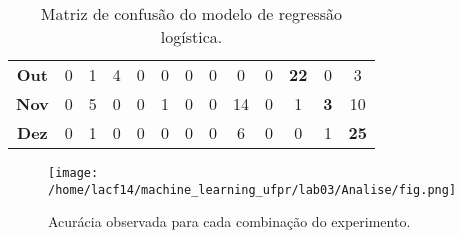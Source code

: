 \begin{table}[h]
\begin{tabular}{c|cccccccccccc}
\textbf{Out} & 0                                & 1                                & 4                                & 0                                & 0                               & 0                               & 0                                & 0                                & \multicolumn{1}{c|}{0}           & \multicolumn{1}{c|}{\textbf{22}} & 0                               & 3                                \\ \cline{11-12}
\textbf{Nov} & 0                                & 5                                & 0                                & 0                                & 1                               & 0                               & 0                                & 14                               & 0                                & \multicolumn{1}{c|}{1}           & \multicolumn{1}{c|}{\textbf{3}} & 10                               \\ \cline{12-13} 
\textbf{Dez} & 0                                & 1                                & 0                                & 0                                & 0                               & 0                               & 0                                & 6                                & 0                                & 0                                & \multicolumn{1}{c|}{1}          & \multicolumn{1}{c|}{\textbf{25}} \\ \hline
\end{tabular}
\caption{Matriz de confusão do modelo de regressão logística.}
\label{tab:my-table}
\end{table}


\begin{landscape}

\begin{figure}[]
\label{fig:fig1}
\centering
\texttt{[image: /home/lacf14/machine\_learning\_ufpr/lab03/Analise/fig.png]}
\caption{Acurácia observada para cada combinação do experimento.}
\end{figure}
\end{landscape}
